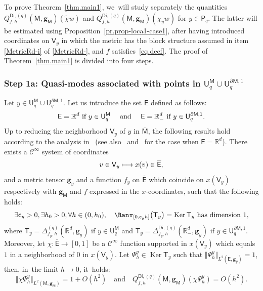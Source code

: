 \documentclass[10pt]{amsart}
\newcommand\mto{\mathchoice{\longmapsto}{\mapsto}{\mapsto}{\mapsto}}
\newcommand{\quand}{\quad\text{and}\quad}
\newcommand{\mbf}[1]{\mathbf{#1}}
\let\pa\partial
\DeclareMathOperator\Ker{Ker}
\theoremstyle{plain}
\theoremstyle{definition}
\begin{document}
To prove Theorem~\ref{thm.main1}, we~will study separately the quantities $Q_{f,h}^{\mathsf{Di},(q)}(\mathsf M,\mbf g_{\mathsf M})(\tilde \chi w)$ and $Q_{f,h}^{\mathsf{Di},(q)}(\mathsf M,\mbf g_{\mathsf M})(\chi_y w)$ for $y\in \mathsf P_q$.
The latter will be estimated using
Proposition~\ref{pr.prop-loca1-case1}, after having introduced
coordinates on $\mathsf V_y$ in which the metric has the block structure
assumed in item \eqref{MetricRd-i} of \ref{MetricRd-}, and $f$ satisfies~\eqref{eq.decf}. The proof of Theorem~\ref{thm.main1} is divided into four steps.


\subsubsection*{Step 1a: Quasi-modes associated with points in $ \mathsf
U_q^{\mathsf M}\cup \mathsf U^{\pa \mathsf M,1}_q$} Let $y\in
\mathsf U_q^{\mathsf M}\cup \mathsf U^{\pa \mathsf M,1}_q$. Let us
introduce the set $\mathsf E$ defined as follows:\vspace*{-3pt}
\[
\text{$\mathsf E=\mathbb R^d$ if $ y\in \mathsf U_q^{\mathsf
M} \quad$ and $\quad\mathsf E=\mathbb R^d_-$ if $y\in \mathsf U^{\pa \mathsf
M,1}_q$.}
\]
Up to reducing the neighborhood $\mathsf V_y$ of $y$ in $\overline{\mathsf M}$, the following results hold according to the analysis in~\cite[Chap.\,3]{helffer-nier-06} (see also~\cite{helffer-sjostrand-85} and~\cite{HKN} for the case when $\mathsf E=\mathbb R^d$). There exists a $\mathcal C^\infty$ system of coordinates\vspace*{-3pt}
\[
v\in \mathsf V_y\mto x(v) \in \overline{\mathsf E},
\]
and a metric tensor $\mbf g_y$ and a function $f_y$ on $
\overline{\mathsf E}$ which coincide on $x(\mathsf V_y)$ respectively with $\mbf
g_{\mathsf M}$ and $f$ expressed in the $x$-coordinates,
such that the following holds:\vspace*{-3pt}
\begin{equation}\label{eq.span=12}
\exists \mathsf c_y>0, \exists h_0 >0, \forall h \in (0,h_0),\quad \Ran \pi_{[0,\mathsf c_yh]}\bigl(\mathsf T_y \bigr)=\Ker \mathsf T_y \text{ has dimension } 1,
\end{equation}
where $\mathsf T_y=\Delta_{f_y,h}^{(q)}(\mathbb R^d,\mbf g_y)$ if
$y\in \mathsf U_q^{\mathsf
M}$ and $\mathsf T_y=\Delta_{f_y,h}^{\mathsf{Di},(q)}(\mathbb R^d_-,\mbf g_y)$ if $y\in \mathsf U^{\pa \mathsf
M,1}_q$.
Moreover, let $\chi: \overline{\mathsf E} \to [0,1]$ be a $\mathcal C^\infty$ function supported in $x(\mathsf V_y)$ which equals~$1$ in a neighborhood of $0$ in $x(\mathsf V_y)$.
Let $\Psi_h^y\in \Ker\mathsf T_y$ such that $ \Vert \Psi_h^y\Vert_{L^2(\mathsf E,\mbf g_y)}=1$, then, in~the limit $h\to 0$, it~holds:
\begin{equation}\label{eq.omega-z2}
\Vert \chi \Psi_h^y \Vert_{L^2(\mathsf M,\mbf g_{\mathsf M})} =1+O (h^{2}) \quand Q_{f,h}^{\mathsf{Di},(q)}(\mathsf M,\mbf g_{\mathsf M})(\chi \Psi_h^y)=O(h^2).
\end{equation}
\end{document}
